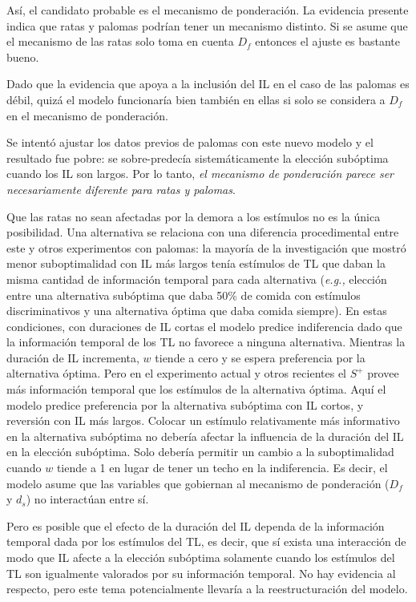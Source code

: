 \documentclass[a4paper,12pt]{article}
\begin{document}
Así, el candidato probable es el mecanismo de ponderación. La evidencia presente indica que ratas y palomas podrían tener un mecanismo distinto. Si se asume que el mecanismo de las ratas solo toma en cuenta $D_{f}$ entonces el ajuste es bastante bueno.

Dado que la evidencia que apoya a la inclusión del IL en el caso de las palomas es débil, quizá el modelo funcionaría bien también en ellas si solo se considera a $D_{f}$ en el mecanismo de ponderación.

Se intentó ajustar los datos previos de palomas con este nuevo modelo y el resultado fue pobre: se sobre-predecía sistemáticamente la elección subóptima cuando los IL son largos. Por lo tanto, {\itshape el mecanismo de ponderación parece ser necesariamente diferente para ratas y palomas}.

Que las ratas no sean afectadas por la demora a los estímulos no es la única posibilidad. Una alternativa se relaciona con una diferencia procedimental entre este y otros experimentos con palomas: la mayoría de la investigación que mostró menor suboptimalidad con IL más largos tenía estímulos de TL que daban la misma cantidad de información temporal para cada alternativa ({\itshape e.g.,} elección entre una alternativa subóptima que daba 50\% de comida con estímulos discriminativos y una alternativa óptima que daba comida siempre). En estas condiciones, con duraciones de IL cortas el modelo predice indiferencia dado que la información temporal de los TL no favorece a ninguna alternativa. Mientras la duración de IL incrementa, $w$ tiende a cero y se espera preferencia por la alternativa óptima. Pero en el experimento actual y otros recientes el $S^{+}$ provee más información temporal que los estímulos de la alternativa óptima. Aquí el modelo predice preferencia por la alternativa subóptima con IL cortos, y reversión con IL más largos. Colocar un estímulo relativamente más informativo en la alternativa subóptima no debería afectar la influencia de la duración del IL en la elección subóptima. Solo debería permitir un cambio a la suboptimalidad cuando $w$ tiende a 1 en lugar de tener un techo en la indiferencia. Es decir, el modelo asume que las variables que gobiernan al mecanismo de ponderación ($D_{f}$ y $d_{s}$) no interactúan entre sí.

Pero es posible que el efecto de la duración del IL dependa de la información temporal dada por los estímulos del TL, es decir, que sí exista una interacción de modo que IL afecte a la elección subóptima solamente cuando los estímulos del TL son igualmente valorados por su información temporal. No hay evidencia al respecto, pero este tema potencialmente llevaría a la reestructuración del modelo.
\end{document}
